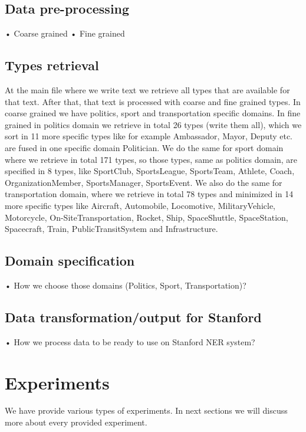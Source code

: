 \documentclass[thesis=M,english]{FITthesis}[2018/05/30]
\begin{document}
\section{Data pre-processing}
•	Coarse grained
•	Fine grained 

\section{Types retrieval}\label{}
At the main file where we write text we retrieve all types that are available for that text. After that, that text is processed with coarse and fine grained types. In coarse grained we have politics, sport and transportation specific domains. In fine grained in politics domain we retrieve in total 26 types (write them all), which we sort in 11 more specific types like for example Ambassador, Mayor, Deputy etc. are fused in one specific domain Politician. We do the same for sport domain where we retrieve in total 171 types, so those types, same as politics domain, are specified in 8 types, like SportClub, SportsLeague, SportsTeam, Athlete, Coach, OrganizationMember, SportsManager, SportsEvent. We also do the same for transportation domain, where we retrieve in total 78 types and minimized in 14 more specific types like Aircraft, Automobile, Locomotive, MilitaryVehicle, Motorcycle, On-SiteTransportation, Rocket, Ship, SpaceShuttle, SpaceStation, Spacecraft, Train, PublicTransitSystem and Infrastructure.  

\section{Domain specification}
•	How we choose those domains (Politics, Sport, Transportation)?

\section{Data transformation/output for Stanford}
•	How we process data to be ready to use on Stanford NER system?



\chapter{Experiments}
We have provide various types of experiments. In next sections we will discuss more about every provided experiment.
\end{document}
